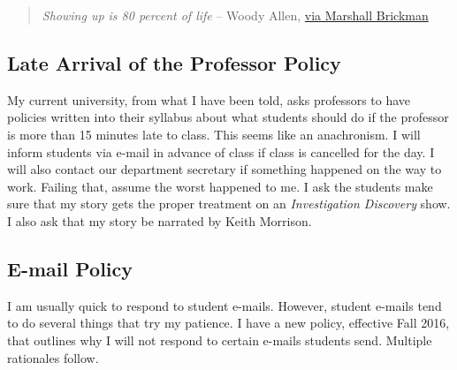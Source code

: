 \documentclass[
      12pt,
        ]{article}
\begin{document}
\begin{quote}
\emph{Showing up is 80 percent of life} -- Woody Allen,
\href{http://quoteinvestigator.com/2013/06/10/showing-up/\#note-6553-1}{via
Marshall Brickman}
\end{quote}

\hypertarget{late-arrival-of-the-professor-policy}{%
\subsection{Late Arrival of the Professor
Policy}\label{late-arrival-of-the-professor-policy}}

My current university, from what I have been told, asks professors to
have policies written into their syllabus about what students should do
if the professor is more than 15 minutes late to class. This seems like
an anachronism. I will inform students via e-mail in advance of class if
class is cancelled for the day. I will also contact our department
secretary if something happened on the way to work. Failing that, assume
the worst happened to me. I ask the students make sure that my story
gets the proper treatment on an \emph{Investigation Discovery} show. I
also ask that my story be narrated by Keith Morrison.

\hypertarget{e-mail-policy}{%
\subsection{E-mail Policy}\label{e-mail-policy}}

I am usually quick to respond to student e-mails. However, student
e-mails tend to do several things that try my patience. I have a new
policy, effective Fall 2016, that outlines why I will not respond to
certain e-mails students send. Multiple rationales follow.
\end{document}
